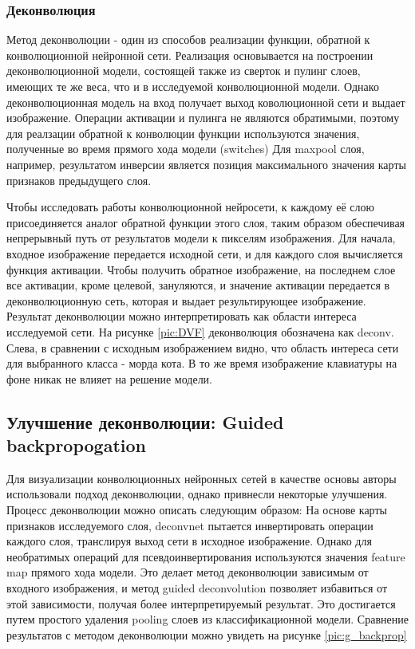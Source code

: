 \documentclass[oneside,final,14pt]{extreport}
\begin{document}
\subsubsection{Деконволюция}
Метод деконволюции\cite{bib:deconv} - один из способов реализации функции, обратной к конволюционной нейронной сети. 
Реализация основывается на построении деконволюционной модели, состоящей также из сверток и пулинг слоев, имеющих те же веса, что и в исследуемой конволюционной модели. Однако деконволюционная модель на вход получает выход коволюционной сети и выдает изображение. Операции активации и пулинга не являются обратимыми, поэтому для реалзации обратной к конволюции функции используются значения, полученные во время прямого хода модели (switches)\cite{bib:deconv} Для maxpool слоя, например, результатом инверсии является позиция максимального значения карты признаков предыдущего слоя.  

Чтобы исследовать работы конволюционной нейросети,  к каждому её слою присоединяется аналог обратной функции этого слоя, таким образом обеспечивая непрерывный путь от результатов модели к пикселям изображения. Для начала, входное изображение передается исходной сети, и для каждого слоя вычисляется функция активации. Чтобы получить обратное изображение, на последнем слое все активации, кроме целевой, зануляются, и значение активации передается в деконволюционную сеть, которая и выдает результирующее изображение. Результат деконволюции можно интерпретировать как области интереса исследуемой сети. На рисунке \ref{pic:DVF} деконволюция обозначена как deconv. Слева, в сравнении с исходным изображением видно, что область интереса сети для выбранного класса - морда кота. В то же время изображение клавиатуры на фоне никак не влияет на решение модели. 
\subsection{Улучшение деконволюции: Guided backpropogation}
Для визуализации конволюционных нейронных сетей в качестве основы авторы\cite{bib:guided_backprop} использовали подход деконволюции, однако привнесли некоторые улучшения.    
Процесс деконволюции можно описать следующим образом: На основе карты признаков исследуемого слоя, deconvnet пытается инвертировать операции каждого слоя, транслируя выход сети в исходное изображение. Однако для необратимых операций для псевдоинвертирования используются значения feature map прямого хода модели. Это делает метод деконволюции зависимым от входного изображения, и метод guided deconvolution позволяет избавиться от этой зависимости, получая более интерпретируемый результат. Это достигается путем простого удаления pooling слоев из классификационной модели.  Сравнение результатов с методом деконволюции можно увидеть на рисунке \ref{pic:g_backprop}
\end{document}

